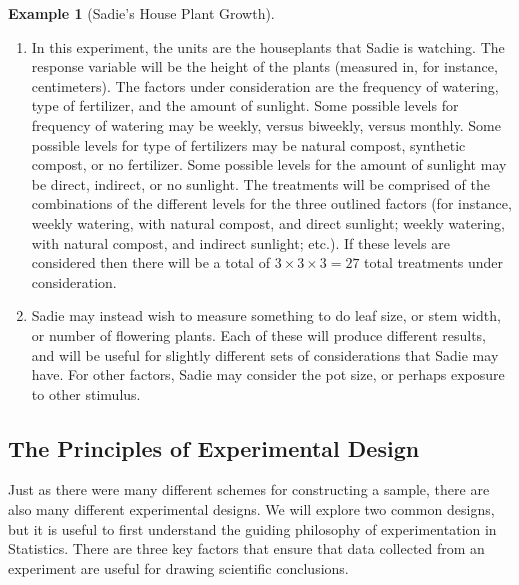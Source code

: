 \documentclass[
  letterpaper,
  DIV=11,
  numbers=noendperiod]{scrreprt}
\providecommand{\tightlist}{%
  \setlength{\itemsep}{0pt}\setlength{\parskip}{0pt}}\usepackage{longtable,booktabs,array}
\theoremstyle{definition}
\theoremstyle{definition}
\newtheorem{example}{Example}[chapter]
\theoremstyle{definition}
\theoremstyle{remark}
\begin{document}
\begin{example}[Sadie's House Plant
Growth]
\begin{tcolorbox}[enhanced jigsaw, colback=white, colframe=quarto-callout-color-frame, arc=.35mm, leftrule=.75mm, rightrule=.15mm, opacityback=0, breakable, bottomrule=.15mm, left=2mm, toprule=.15mm]
\begin{enumerate}
\def\labelenumi{\alph{enumi}.}
\tightlist
\item
  In this experiment, the units are the houseplants that Sadie is
  watching. The response variable will be the height of the plants
  (measured in, for instance, centimeters). The factors under
  consideration are the frequency of watering, type of fertilizer, and
  the amount of sunlight. Some possible levels for frequency of watering
  may be weekly, versus biweekly, versus monthly. Some possible levels
  for type of fertilizers may be natural compost, synthetic compost, or
  no fertilizer. Some possible levels for the amount of sunlight may be
  direct, indirect, or no sunlight. The treatments will be comprised of
  the combinations of the different levels for the three outlined
  factors (for instance, weekly watering, with natural compost, and
  direct sunlight; weekly watering, with natural compost, and indirect
  sunlight; etc.). If these levels are considered then there will be a
  total of \(3\times 3 \times 3 = 27\) total treatments under
  consideration.
\item
  Sadie may instead wish to measure something to do leaf size, or stem
  width, or number of flowering plants. Each of these will produce
  different results, and will be useful for slightly different sets of
  considerations that Sadie may have. For other factors, Sadie may
  consider the pot size, or perhaps exposure to other
  stimulus.\footnotemark{}
\end{enumerate}

\end{tcolorbox}


\end{example}

\subsection{The Principles of Experimental
Design}\label{the-principles-of-experimental-design}

Just as there were many different schemes for constructing a sample,
there are also many different experimental designs. We will explore two
common designs, but it is useful to first understand the guiding
philosophy of experimentation in Statistics. There are three key factors
that ensure that data collected from an experiment are useful for
drawing scientific conclusions.
\end{document}
